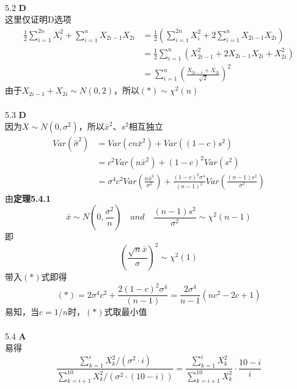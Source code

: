 \documentclass[a4paper]{ctexart}    %
\begin{document}
	\\
	5.2 \quad \textbf{D} \\
	这里仅证明D选项
	\begin{equation*}
		\begin{split}
			\frac{1}{2}\sum\limits_{i=1}^{2n}X_i^2 + \sum\limits_{i=1}^{n} X_{2i-1}X_{2i} &= \frac{1}{2}\left(\sum\limits_{i=1}^{2n}X_i^2 + 2\sum\limits_{i=1}^{n} X_{2i-1}X_{2i}\right) \\
			&= \frac{1}{2}\sum\limits_{i=1}^{n}\left(X_{2i-1}^2 + 2X_{2i-1}X_{2i} + X_{2i}^2 \right) \\
			&= \sum\limits_{i=1}^{n} \left(\frac{X_{2i-1} + X_{2i}}{\sqrt{2}}\right)^2
		\end{split}
		\tag{$*$}
	\end{equation*}
	由于$ X_{2i-1} + X_{2i} \sim N(0, 2) $，所以$ (*) \sim \chi^2(n) $\\
	\\
	5.3 \quad \textbf{D} \\
	因为$X\sim N(0, \sigma^2)$，所以$\bar{x}^2$、$ s^2 $相互独立
	\begin{equation*}
		\begin{split}
			Var(\hat{\sigma}^2) &= Var(cn\bar{x}^2) + Var((1-c)s^2) \\
			&= c^2Var(n\bar{x}^2) + (1-c)^2Var(s^2) \\
			&= \sigma^4c^2Var\left(\frac{n\bar{x}^2}{\sigma^2}\right) + \frac{(1-c)^2\sigma^4}{(n-1)^2}Var\left(\frac{(n-1)s^2}{\sigma^2}\right)
		\end{split}
		\tag{$*$}
	\end{equation*}
	由\textbf{定理5.4.1}
	\begin{equation*}
		\bar{x} \sim N\left(0, \frac{\sigma^2}{n}\right) \quad and \quad \frac{(n-1)s^2}{\sigma^2} \sim \chi^2(n-1)
	\end{equation*}
	即
	\begin{equation*}
		\left(\frac{\sqrt{n}\bar{x}}{\sigma}\right)^2 \sim \chi^2(1)
	\end{equation*}
	带入$(*)$式即得
	\begin{equation*}
		(*) = 2\sigma^4c^2 + \frac{2(1-c)^2\sigma^4}{(n-1)} = \frac{2\sigma^4}{n-1}(nc^2 - 2c + 1)
	\end{equation*}
	易知，当$ c = 1/n $时，$ (*) $式取最小值\\
	\\
	5.4 \quad \textbf{A} \\
	易得
	\begin{equation*}
		\frac{\sum\limits_{k=1}^{i} X_k^2 / (\sigma^2\cdot i) }{\sum\limits_{k=i+1}^{10}X_k^2/ (\sigma^2\cdot (10-i))} = \frac{\sum\limits_{k=1}^{i} X_k^2}{\sum\limits_{k=i+1}^{10}X_k^2}\cdot \frac{10-i}{i}
	\end{equation*}
\end{document}
